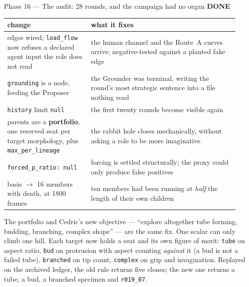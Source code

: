 \documentclass[11pt,a4paper]{article}
\newcommand{\code}[1]{\texttt{#1}}
\newcommand{\done}{\textcolor{good}{\textbf{DONE}}}
\begin{document}
\begin{phasebox}{Phase 16 --- The audit: 28 rounds, and the campaign had no organ \hfill \done}
\begin{center}\small
\begin{tabular}{@{}p{0.34\linewidth}p{0.60\linewidth}@{}}
\toprule
\textbf{change} & \textbf{what it fixes} \\
\midrule
edges wired; \code{load\_flow} now refuses a declared agent input the role does not read &
the human channel and the Route~A curves arrive; negative-tested against a planted fake edge \\
\code{grounding} is a node, feeding the Proposer & the Grounder was terminal, writing the round's
most strategic sentence into a file nothing read \\
\code{history} limit \code{null} & the first twenty rounds become visible again \\
parents are a \textbf{portfolio}, one reserved seat per target morphology, plus
\code{max\_per\_lineage} & the rabbit hole closes mechanically, without asking a role to be more
imaginative \\
\code{forced\_p\_ratio: null} & forcing is settled structurally; the proxy could only produce false
positives \\
basis $\to$ 16 members with death, at 1800 frames & ten members had been running at \emph{half} the
length of their own children \\
\bottomrule
\end{tabular}
\end{center}

\noindent The portfolio and Cedric's new objective --- ``explore altogether tube forming, budding,
branching, complex shape'' --- are the same fix. One scalar can only climb one hill. Each target
now holds a seat and its own figure of merit: \code{tube} on aspect ratio, \code{bud} on protrusion
with aspect counting \emph{against} it (a bud is not a failed tube), \code{branched} on tip count,
\code{complex} on grip and invagination. Replayed on the archived ledger, the old rule returns five
clones; the new one returns a tube, a bud, a branched specimen and \code{r019\_07}.


\end{phasebox}
\end{document}
